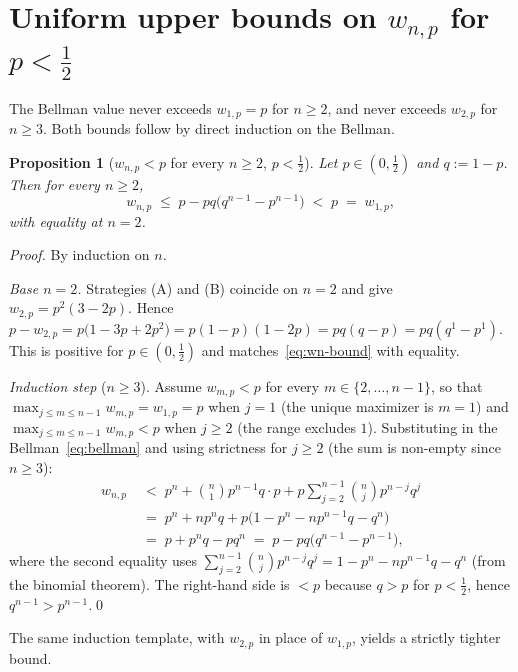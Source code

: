 \documentclass{article}
\newtheorem{proposition}{Proposition}
\theoremstyle{definition}
\theoremstyle{remark}
\begin{document}
\section*{Uniform upper bounds on $w_{n,p}$ for $p<\tfrac12$}

The Bellman value never exceeds $w_{1,p}=p$ for $n\ge 2$, and never
exceeds $w_{2,p}$ for $n\ge 3$. Both bounds follow by direct
induction on the Bellman.

\begin{proposition}[$w_{n,p}<p$ for every $n\ge 2$, $p<\tfrac12$]\label{prop:wn-bounded-by-p}
Let $p\in(0,\tfrac12)$ and $q:=1-p$. Then for every $n\ge 2$,
\begin{equation}\label{eq:wn-bound}
  w_{n,p}\;\le\;p-pq\bigl(q^{n-1}-p^{n-1}\bigr)\;<\;p\;=\;w_{1,p},
\end{equation}
with equality at $n=2$.
\end{proposition}

\begin{proof}
By induction on $n$.

\emph{Base $n=2$.} Strategies (A) and (B) coincide on $n=2$ and give
$w_{2,p}=p^2(3-2p)$. Hence
$p-w_{2,p}=p\bigl(1-3p+2p^{2}\bigr)=p(1-p)(1-2p)=pq(q-p)=pq(q^{1}-p^{1})$.
This is positive for $p\in(0,\tfrac12)$ and matches~\eqref{eq:wn-bound}
with equality.

\emph{Induction step} ($n\ge 3$). Assume $w_{m,p}<p$ for every
$m\in\{2,\dots,n-1\}$, so that
$\max_{j\le m\le n-1}w_{m,p}=w_{1,p}=p$ when $j=1$ (the unique
maximizer is $m=1$) and $\max_{j\le m\le n-1}w_{m,p}<p$ when $j\ge 2$
(the range excludes $1$). Substituting in the Bellman~\eqref{eq:bellman}
and using strictness for $j\ge 2$ (the sum is non-empty since
$n\ge 3$):
\begin{align*}
  w_{n,p}
  &\;<\;p^n+\binom{n}{1}p^{n-1}q\cdot p
       +p\sum_{j=2}^{n-1}\binom{n}{j}p^{n-j}q^{j}\\
  &\;=\;p^n+np^nq+p\bigl(1-p^n-np^{n-1}q-q^n\bigr)\\
  &\;=\;p+p^nq-pq^n
   \;=\;p-pq\bigl(q^{n-1}-p^{n-1}\bigr),
\end{align*}
where the second equality uses
$\sum_{j=2}^{n-1}\binom{n}{j}p^{n-j}q^{j}=1-p^n-np^{n-1}q-q^n$ (from
the binomial theorem). The right-hand side is $<p$ because $q>p$ for
$p<\tfrac12$, hence $q^{n-1}>p^{n-1}$.\qed
\end{proof}

The same induction template, with $w_{2,p}$ in place of $w_{1,p}$,
yields a strictly tighter bound.
\end{document}
